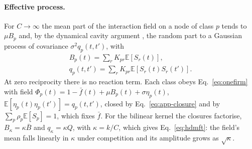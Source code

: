 \documentclass[pre,twocolumn,superscriptaddress,nofootinbib]{revtex4-2}
\newcommand{\E}{\mathbb E}
\begin{document}
\paragraph{Effective process.}  For $C\to\infty$ the mean part of the interaction field on a node of
class $p$ tends to $\mu B_p$ and, by the dynamical cavity argument
\cite{bunin2017,galla2018,aguirrelopez}, the random part to a Gaussian process of covariance
$\sigma^2q_p(t,t')$, with
\begin{gather}
B_p(t)=\sum_rK_{pr}\E[S_r(t)],\nonumber\\
q_p(t,t')=\sum_rK_{pr}\E[S_r(t)S_r(t')] .
\label{eq:app-closure}
\end{gather}
At zero reciprocity there is no reaction term.  Each class obeys Eq.~\eqref{eq:onefirm} with field
$\Phi_p(t)=1-\bar f(t)+\mu B_p(t)+\sigma\eta_p(t)$, $\E[\eta_p(t)\eta_p(t')]=q_p(t,t')$, closed by
Eq.~\eqref{eq:app-closure} and by $\sum_p\rho_p\E[S_p]=1$, which fixes $\bar f$.  For the bilinear kernel the
closures factorise, $B_\kappa=\kappa\bar B$ and $q_\kappa=\kappa Q$, with $\kappa=k/C$, which gives Eq.~\eqref{eq:hdmft}: the field's mean falls linearly in $\kappa$ under competition and its amplitude grows as
$\sqrt\kappa$.
\end{document}
